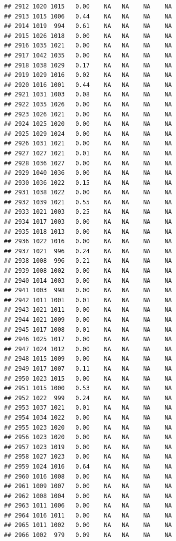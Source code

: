\documentclass{article}\usepackage{graphicx, color}
\makeatletter
\newenvironment{kframe}{%
 \def\at@end@of@kframe{}%
 \ifinner\ifhmode%
  \def\at@end@of@kframe{\end{minipage}}%
  \begin{minipage}{\columnwidth}%
 \fi\fi%
 \def\FrameCommand##1{\hskip\@totalleftmargin \hskip-\fboxsep
 \colorbox{shadecolor}{##1}\hskip-\fboxsep
     \hskip-\linewidth \hskip-\@totalleftmargin \hskip\columnwidth}%
 \MakeFramed {\advance\hsize-\width
   \@totalleftmargin\z@ \linewidth\hsize
   \@setminipage}}%
 {\par\unskip\endMakeFramed%
 \at@end@of@kframe}
\newenvironment{knitrout}{}{} %
\makeatother
\begin{document}
\begin{knitrout}
\begin{kframe}
\begin{verbatim}
## 2912 1020 1015   0.00    NA   NA    NA    NA
## 2913 1015 1006   0.44    NA   NA    NA    NA
## 2914 1019  994   0.61    NA   NA    NA    NA
## 2915 1026 1018   0.00    NA   NA    NA    NA
## 2916 1035 1021   0.00    NA   NA    NA    NA
## 2917 1042 1035   0.00    NA   NA    NA    NA
## 2918 1038 1029   0.17    NA   NA    NA    NA
## 2919 1029 1016   0.02    NA   NA    NA    NA
## 2920 1016 1001   0.44    NA   NA    NA    NA
## 2921 1031 1003   0.08    NA   NA    NA    NA
## 2922 1035 1026   0.00    NA   NA    NA    NA
## 2923 1026 1021   0.00    NA   NA    NA    NA
## 2924 1025 1020   0.00    NA   NA    NA    NA
## 2925 1029 1024   0.00    NA   NA    NA    NA
## 2926 1031 1021   0.00    NA   NA    NA    NA
## 2927 1027 1021   0.01    NA   NA    NA    NA
## 2928 1036 1027   0.00    NA   NA    NA    NA
## 2929 1040 1036   0.00    NA   NA    NA    NA
## 2930 1036 1022   0.15    NA   NA    NA    NA
## 2931 1038 1022   0.00    NA   NA    NA    NA
## 2932 1039 1021   0.55    NA   NA    NA    NA
## 2933 1021 1003   0.25    NA   NA    NA    NA
## 2934 1017 1003   0.00    NA   NA    NA    NA
## 2935 1018 1013   0.00    NA   NA    NA    NA
## 2936 1022 1016   0.00    NA   NA    NA    NA
## 2937 1021  996   0.24    NA   NA    NA    NA
## 2938 1008  996   0.21    NA   NA    NA    NA
## 2939 1008 1002   0.00    NA   NA    NA    NA
## 2940 1014 1003   0.00    NA   NA    NA    NA
## 2941 1003  998   0.00    NA   NA    NA    NA
## 2942 1011 1001   0.01    NA   NA    NA    NA
## 2943 1021 1011   0.00    NA   NA    NA    NA
## 2944 1021 1009   0.00    NA   NA    NA    NA
## 2945 1017 1008   0.01    NA   NA    NA    NA
## 2946 1025 1017   0.00    NA   NA    NA    NA
## 2947 1024 1012   0.00    NA   NA    NA    NA
## 2948 1015 1009   0.00    NA   NA    NA    NA
## 2949 1017 1007   0.11    NA   NA    NA    NA
## 2950 1023 1015   0.00    NA   NA    NA    NA
## 2951 1015 1000   0.53    NA   NA    NA    NA
## 2952 1022  999   0.24    NA   NA    NA    NA
## 2953 1037 1021   0.01    NA   NA    NA    NA
## 2954 1034 1022   0.00    NA   NA    NA    NA
## 2955 1023 1020   0.00    NA   NA    NA    NA
## 2956 1023 1020   0.00    NA   NA    NA    NA
## 2957 1023 1019   0.00    NA   NA    NA    NA
## 2958 1027 1023   0.00    NA   NA    NA    NA
## 2959 1024 1016   0.64    NA   NA    NA    NA
## 2960 1016 1008   0.00    NA   NA    NA    NA
## 2961 1009 1007   0.00    NA   NA    NA    NA
## 2962 1008 1004   0.00    NA   NA    NA    NA
## 2963 1011 1006   0.00    NA   NA    NA    NA
## 2964 1016 1011   0.00    NA   NA    NA    NA
## 2965 1011 1002   0.00    NA   NA    NA    NA
## 2966 1002  979   0.09    NA   NA    NA    NA

\end{verbatim}
\end{kframe}
\end{knitrout}
\end{document}
